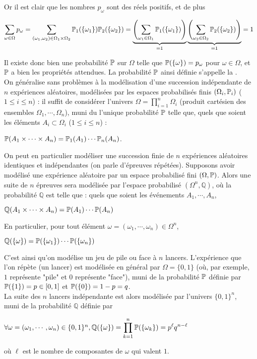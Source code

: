 \documentclass[12pt,a4paper]{report}
\begin{document}
Or il est clair que les nombres $p_\omega$ sont des réels positifs, et de plus
\begin{center}
$\displaystyle \sum_{\omega \in \Omega} p_\omega = \sum_{(\omega_1,\omega_2) \in \Omega_1 \times \Omega_2}  \mathbb{P}_1(\{\omega_1\}) \mathbb{P}_2(\{\omega_2\}) = \underbrace{\left(\sum_{\omega_1 \in \Omega_1}\mathbb{P}_1(\{\omega_1\})\right)}_{=1}\underbrace{\left(\sum_{\omega_2 \in \Omega_2} \mathbb{P}_2(\{\omega_2\})\right)}_{=1} = 1$
\end{center}
Il existe donc bien une probabilité $\mathbb{P}$ sur $\Omega$ telle que $\mathbb{P}(\{\omega\}) = p_\omega$ pour $\omega \in \Omega$, et $\mathbb{P}$ a bien les propriétés attendues. La probabilité $\mathbb{P}$ ainsi définie s'appelle la . \\

On généralise sans problèmes à la modélisation d'une succession indépendante de $n$ expériences aléatoires, modélisées par les espaces probabilisés finis $(\Omega_i,\mathbb{P}_i)$ ($1 \le i \le n$) : il suffit de considérer l'univers $\Omega = \prod_{i=1}^n \Omega_i$ (produit cartésien des ensembles $\Omega_1, \cdots,\Omega_n$), muni du l'unique probabilité $\mathbb{P}$ telle que, quels que soient les éléments $A_i \subset \Omega_i$ ($1 \le i \le n$) : 
\begin{center}
$\mathbb{P}(A_1 \times \cdots \times A_n) = \mathbb{P}_1(A_1) \cdots \mathbb{P}_n(A_n)$.
\end{center}

On peut en particulier modéliser une succession finie de $n$ expériences aléatoires identiques et indépendantes (on parle d'épreuves répétées). Supposons avoir modélisé une expérience aléatoire par un espace probabilisé fini $(\Omega,\mathbb{P})$. Alors une suite de $n$ épreuves sera modélisée par l'espace probabilisé $(\Omega^n, \mathbb{Q})$, où la probabilité $\mathbb{Q}$ est telle que : quels que soient les événements $A_1, \cdots, A_n$, 
\begin{center}
$\mathbb{Q}(A_1 \times \cdots \times A_n) = \mathbb{P}(A_1) \cdots \mathbb{P}(A_n)$
\end{center}

En particulier, pour tout élément $\omega = (\omega_1,\cdots,\omega_n) \in \Omega^n$, 
\begin{center}
$\mathbb{Q}(\{\omega\}) = \mathbb{P}(\{\omega_1\}) \cdots \mathbb{P}(\{\omega_n\})$
\end{center}

C'est ainsi qu'on modélise un jeu de pile ou face à $n$ lancers. L'expérience que l'on répète (un lancer) est modélisée en général par $\Omega = \{0,1\}$ (où, par exemple, $1$ représente "pile" et $0$ représente "face"), muni de la probabilité $\mathbb{P}$ définie par $\mathbb{P}(\{1\}) = p \in [0,1]$ et $\mathbb{P}(\{0\}) = 1-p = q$. \\
La suite des $n$ lancers indépendante est alors modélisée par l'univers $\{0,1\}^n$, muni de la probabilité $\mathbb{Q}$ définie par
\begin{center}
$\forall \omega = (\omega_1,\cdots,\omega_n) \in \{0,1\}^n, \mathbb{Q}(\{\omega\}) = \displaystyle \prod_{k=1}^n \mathbb{P}(\{\omega_k\}) = p^\ell q^{n-\ell}$
\end{center}
où $\ell$ est le nombre de composantes de $\omega$ qui valent $1$. \\
\end{document}

